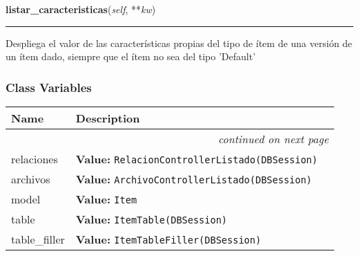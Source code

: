     \vspace{0.5ex}

\hspace{.8\funcindent}\begin{boxedminipage}{\funcwidth}

    \raggedright \textbf{listar\_caracteristicas}(\textit{self}, **\textit{kw})

    \vspace{-1.5ex}

    \rule{\textwidth}{0.5\fboxrule}
\setlength{\parskip}{2ex}
    Despliega el valor de las características propias del tipo de ítem de 
    una versión de un ítem dado, siempre que el ítem no sea del tipo 
    'Default'

\setlength{\parskip}{1ex}
    \end{boxedminipage}



  \subsubsection{Class Variables}

    \vspace{-1cm}
\hspace{\varindent}\begin{longtable}{|p{\varnamewidth}|p{\vardescrwidth}|l}
\cline{1-2}
\cline{1-2} \centering \textbf{Name} & \centering \textbf{Description}& \\
\cline{1-2}
\endhead\cline{1-2}\multicolumn{3}{r}{\small\textit{continued on next page}}\\\endfoot\cline{1-2}
\endlastfoot\raggedright r\-e\-l\-a\-c\-i\-o\-n\-e\-s\- & \raggedright \textbf{Value:} 
{\tt RelacionControllerListado(DBSession)}&\\
\cline{1-2}
\raggedright a\-r\-c\-h\-i\-v\-o\-s\- & \raggedright \textbf{Value:} 
{\tt ArchivoControllerListado(DBSession)}&\\
\cline{1-2}
\raggedright m\-o\-d\-e\-l\- & \raggedright \textbf{Value:} 
{\tt Item}&\\
\cline{1-2}
\raggedright t\-a\-b\-l\-e\- & \raggedright \textbf{Value:} 
{\tt ItemTable(DBSession)}&\\
\cline{1-2}
\raggedright t\-a\-b\-l\-e\-\_\-f\-i\-l\-l\-e\-r\- & \raggedright \textbf{Value:} 
{\tt ItemTableFiller(DBSession)}&\\
\cline{1-2}
\end{longtable}


